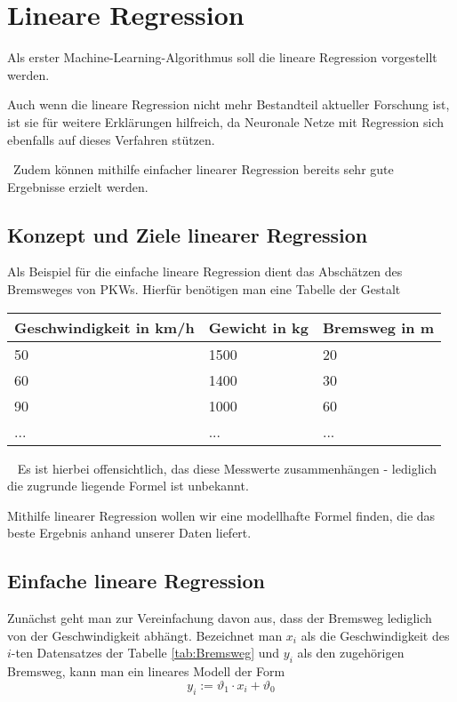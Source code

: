 \section{Lineare Regression}
\label{sec:LineareRegression}
Als erster Machine-Learning-Algorithmus soll die lineare Regression vorgestellt werden. 

Auch wenn die lineare Regression nicht mehr Bestandteil aktueller Forschung ist, ist sie für weitere Erklärungen hilfreich, da Neuronale Netze mit Regression sich ebenfalls auf dieses Verfahren stützen. 

~\newline Zudem können mithilfe einfacher linearer Regression bereits sehr gute Ergebnisse erzielt werden.
\subsection{Konzept und Ziele linearer Regression}
Als Beispiel für die einfache lineare Regression dient das Abschätzen des Bremsweges von PKWs. Hierfür benötigen man eine Tabelle der Gestalt

\begin{center}
	\label{tab:Bremsweg}
	\begin{tabular}{|p{}|p{}|p{}|}
		\hline
		Geschwindigkeit in km/h & Gewicht in kg & Bremsweg in m  \\ \hline
		50& 1500 & 20 \\ \hline
		60& 1400 & 30 \\ \hline
		90& 1000 & 60 \\ \hline
		...& ... & ... \\ \hline
	\end{tabular}
\end{center}
~\newline
Es ist hierbei offensichtlich, das diese Messwerte zusammenhängen - lediglich die zugrunde liegende Formel ist unbekannt. 

Mithilfe linearer Regression wollen wir eine modellhafte Formel finden, die das beste Ergebnis anhand unserer Daten liefert.
\subsection{Einfache lineare Regression}
Zunächst geht man zur Vereinfachung davon aus, dass der Bremsweg lediglich von der Geschwindigkeit abhängt. Bezeichnet man $x_i$ als die Geschwindigkeit des $i$-ten Datensatzes der Tabelle \ref{tab:Bremsweg} und $y_i$ als den zugehörigen Bremsweg, kann man ein lineares Modell der Form 
\begin{equation}
	y_i := \vartheta_1 \cdot x_i + \vartheta_0 
\end{equation}


